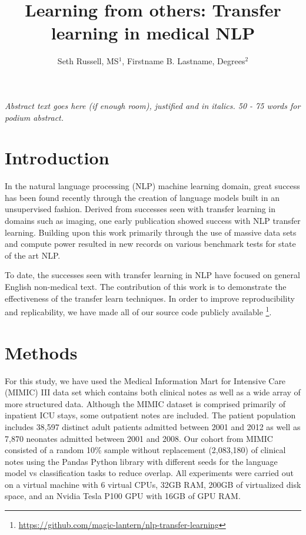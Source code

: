 \documentclass{amia}
\begin{document}
\title{Learning from others: Transfer learning in medical NLP}

\author{Seth Russell, MS$^{1}$, Firstname B. Lastname, Degrees$^{2}$}


\maketitle


\textit{Abstract text goes here (if enough room),  justified and in italics.  50 - 75 words for podium abstract.}

\section*{Introduction}

In the natural language processing (NLP) machine learning domain, great success has been found recently through the creation of language models built in an unsupervised fashion. Derived from successes seen with transfer learning in domains such as imaging, one early publication \cite{howard_universal_2018} showed success with NLP transfer learning. Building upon this work primarily through the use of massive data sets and compute power \cite{radford_improving_2018,radford_language_2019} resulted in new records on various benchmark tests for state of the art NLP.

To date, the successes seen with transfer learning in NLP have focused on general English non-medical text. The contribution of this work is to demonstrate the effectiveness of the transfer learn techniques. In order to improve reproducibility and replicability, we have made all of our source code publicly available \footnote{\url{https://github.com/magic-lantern/nlp-transfer-learning}}.

\section*{Methods}

For this study, we have used the Medical Information Mart for Intensive Care (MIMIC) III \cite{johnson_mimic-iii_2016} data set which contains both clinical notes as well as a wide array of more structured data. Although the MIMIC dataset is comprised primarily of inpatient ICU stays, some outpatient notes are included. The patient population includes 38,597 distinct adult patients admitted between 2001 and 2012 as well as 7,870 neonates admitted between 2001 and 2008. Our cohort from MIMIC consisted of a random 10\% sample without replacement (2,083,180) of clinical notes using the Pandas Python library \cite{mckinney-proc-scipy-2010} with different seeds for the language model vs classification tasks to reduce overlap. All experiments were carried out on a virtual machine with 6 virtual CPUs, 32GB RAM, 200GB of virtualized disk space, and an Nvidia Tesla P100 GPU with 16GB of GPU RAM.
\end{document}
